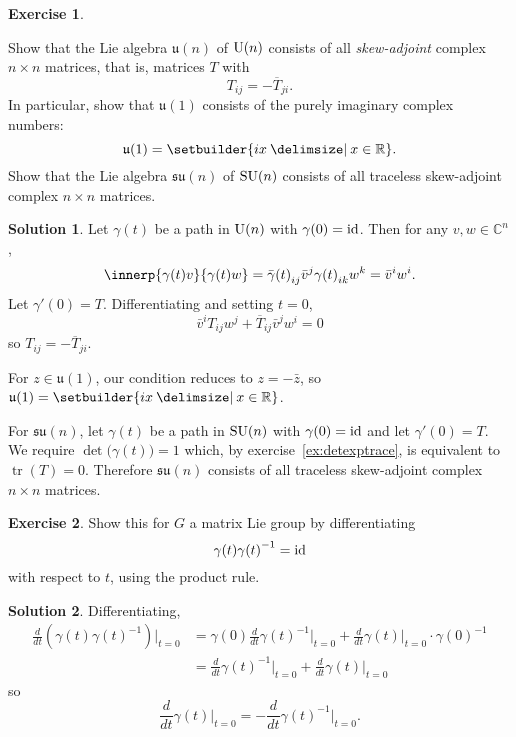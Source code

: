 \documentclass[11pt, a4paper]{report}
\theoremstyle{definition}
\newtheorem{exercise}{Exercise}[part]
\newtheorem{solution}{Solution}[part]
\newenvironment{ex}{\begin{exercise}}{\end{exercise}\pagebreak[1]}
\newenvironment{sol}{\begin{solution}}{\end{solution}\pagebreak[3]}
\newcommand*{\U}{\ensuremath\text{U}}
\newcommand*{\SU}{\ensuremath\text{SU}}
\newcommand*{\op}[1]{\ensuremath\mathop{}\mathopen{}#1}
\DeclareMathOperator{\tr}{tr}
\newcommand*{\id}{\op{\mathrm{id}}}
\begin{document}
\begin{ex}\label{ex:suntracelessskewadjoint}

Show that the Lie algebra $\mathfrak{u}(n)$ of $\U(n)$ consists of all \emph{skew-adjoint} complex $n \times n$ matrices, that is, matrices $T$ with
\[
    T_{ij} = -\overline{T}_{ji}.
\]
In particular, show that $\mathfrak{u}(1)$ consists of the purely imaginary complex numbers:
\[
    \mathfrak{u}(1) = \setbuilder{ix \given x \in \mathbb{R}}.
\]
Show that the Lie algebra $\mathfrak{su}(n)$ of $\SU(n)$ consists of all traceless skew-adjoint complex $n \times n$ matrices.

\end{ex}

\begin{sol}

Let $\gamma(t)$ be a path in $\U(n)$ with $\gamma(0) = \id$.
Then for any $v, w \in \mathbb{C}^n$,
\[
    \innerp{\gamma(t) v}{\gamma(t) w}
        = {\bar{\gamma}(t)}_{ij}\bar{v}^j {\gamma(t)}_{ik} w^k = \bar{v}^i w^i.
\]
Let $\gamma'(0) = T$.
Differentiating and setting $t = 0$,
\[
    \bar{v}^i T_{ij} w^j + {\overline{T}}_{ij}\bar{v}^j w^i = 0
\]
so $T_{ij} = -\overline{T}_{ji}$.

For $z \in \mathfrak{u}(1)$, our condition reduces to $z = -\bar{z}$, so $\mathfrak{u}(1) = \setbuilder{ix \given x \in \mathbb{R}}$.

For $\mathfrak{su}(n)$, let $\gamma(t)$ be a path in $\SU(n)$ with $\gamma(0) = \id$ and let $\gamma'(0) = T$.
We require $\det\bigl(\gamma(t)\bigr) = 1$ which, by exercise~\ref{ex:detexptrace}, is equivalent to $\tr(T) = 0$.
Therefore $\mathfrak{su}(n)$ consists of all traceless skew-adjoint complex $n \times n$ matrices.

\end{sol}

\begin{ex}

Show this for $G$ a matrix Lie group by differentiating
\[
    \gamma(t) {\gamma(t)}^{-1} = \id
\]
with respect to $t$, using the product rule.

\end{ex}

\begin{sol}

Differentiating,
\begin{align*}
    \frac{d}{dt} \left(\gamma(t) {\gamma(t)}^{-1} \right) \Big|_{t = 0} \!
        &= \gamma(0) \frac{d}{dt} {\gamma(t)}^{-1} \Big|_{t = 0}
            + \frac{d}{dt} \gamma(t) \Big|_{t = 0} \cdot {\gamma(0)}^{-1} \\
        &= \frac{d}{dt} {\gamma(t)}^{-1} \Big|_{t = 0}
            + \frac{d}{dt} \gamma(t) \Big|_{t = 0}
\end{align*}
so
\[
    \frac{d}{dt} \gamma(t) \Big|_{t = 0} \!
        = -\frac{d}{dt} {\gamma(t)}^{-1} \Big|_{t = 0}.
\]

\end{sol}
\end{document}
